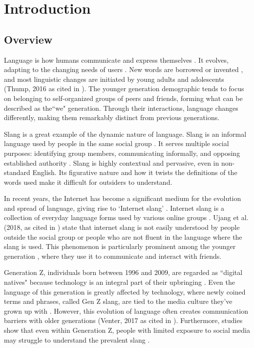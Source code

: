 \chapter{Introduction}
\label{sec:researchdesc}    %

\section{Overview}
\label{sec:overview}

Language is how humans communicate and express themselves \cite{Crystal_Robins_2024}. It evolves, adapting to the changing needs of users \cite{Jeresano_Carretero_2022}. New words are borrowed or invented \cite{article}, and most linguistic changes are initiated by young adults and adolescents (Thump, 2016 as cited in \cite{Jeresano_Carretero_2022}). The younger generation demographic tends to focus on belonging to self-organized groups of peers and friends, forming what can be described as the``we" generation. Through their interactions, language changes differently, making them remarkably distinct from previous generations.

Slang is a great example of the dynamic nature of language. Slang is an informal language used by people in the same social group \cite{Fernández-Toro_2016}. It serves multiple social purposes: identifying group members, communicating informally, and opposing established authority \cite{McArthur_1998}. Slang is highly contextual and pervasive, even in non-standard English. Its figurative nature and how it twists the definitions of the words used make it difficult for outsiders to understand. 

In recent years, the Internet has become a significant medium for the evolution and spread of language, giving rise to `Internet slang' \cite{Liu_Zhang_Li_2023}. Internet slang is a collection of everyday language forms used by various online groups \cite{Barseghyan2014ONSA}. Ujang et al. (2018, as cited in \cite{Sabri2020}) state that internet slang is not easily understood by people outside the social group or people who are not fluent in the language where the slang is used. This phenomenon is particularly prominent among the younger generation \cite{Maulidiya_Wijaya_Mauren_Adha_Pandin_2021}, where they use it to communicate and interact with friends.

Generation Z, individuals born between 1996 and 2009, are regarded as ``digital natives" because technology is an integral part of their upbringing \cite{Dua_Jacobson_Ellingrud_Enomoto_Cordina_Coe_Finneman_2024}. Even the language of this generation is greatly affected by technology, where newly coined terms and phrases, called Gen Z slang, are tied to the media culture they've grown up with \cite{Jeresano_Carretero_2022}. However, this evolution of language often creates communication barriers with older generations (Venter, 2017 as cited in \cite{Ghazali_Abdullah_2021}). Furthermore, studies show that even within Generation Z, people with limited exposure to social media may struggle to understand the prevalent slang \cite{Vacalares_Salas_Babac_Cagalawan_Calimpong_2023}. 


